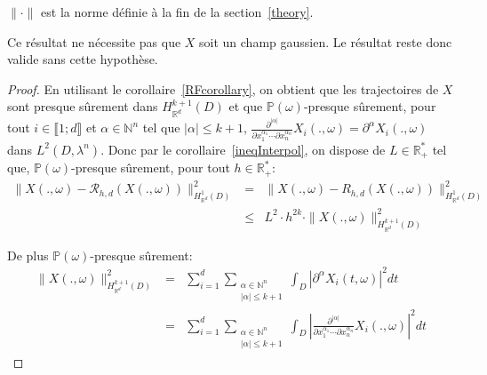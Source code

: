\begin{remark}
$\| \cdot \|$ est la norme définie à la fin de la section~\ref{theory}.
\end{remark}

\begin{remark}
  Ce résultat ne nécessite pas que $X$ soit un champ gaussien. Le résultat
  reste donc valide sans cette hypothèse.
\end{remark}

\begin{proof}
  En utilisant le corollaire~\ref{RFcorollary}, on obtient que les trajectoires
  de $X$ sont presque sûrement dans $H^{k+1}_{\mathbb{R}^d}(D)$ et que $\mathbb{P}(\omega)$-presque sûrement,
  pour tout $i \in \llbracket 1;d \rrbracket$ et $\alpha \in \mathbb{N}^{n}$ tel que $|\alpha| \leq k+1$,
  $\frac{\partial^{|\alpha|}}{\partial x_{1}^{\alpha_1} \cdots \partial x_{n}^{\alpha_n} } X_i(.,\omega) = \partial^{\alpha}X_i(.,\omega)$ dans $L^2(D,\lambda^n)$.
  Donc par le corollaire~\ref{ineqInterpol}, on dispose de $L \in \mathbb{R}_{+}^{*}$ tel que,
  $\mathbb{P}(\omega)$-presque sûrement, pour tout $h \in \mathbb{R}^{*}_{+}$:
  \begin{eqnarray*}
    \|X(.,\omega) - \mathcal{R}_{h,d}(X(.,\omega)) \|_{H^{1}_{\mathbb{R}^d}(D)}^2 &=& \|X(.,\omega) - R_{h,d}(X(.,\omega)) \|_{H^{1}_{\mathbb{R}^d}(D)}^2 \\
    &\leq& L^2 \cdot h^{2k} \cdot \|X(.,\omega)\|_{H^{k+1}_{\mathbb{R}^d}(D)}^2
  \end{eqnarray*}

  \noindent De plus $\mathbb{P}(\omega)$-presque sûrement:
  \begin{eqnarray*}
    \|X(.,\omega)\|_{H^{k+1}_{\mathbb{R}^d}(D)}^2 &=& \displaystyle\sum_{i=1}^{d}  \displaystyle\sum_{\substack{\alpha \in \mathbb{N}^n \\ |\alpha| \leq k+1}} \int_D |\partial^{\alpha}X_i(t,\omega)|^2 dt \\
                                          &=& \displaystyle\sum_{i=1}^{d}  \displaystyle\sum_{\substack{\alpha \in \mathbb{N}^n \\  |\alpha| \leq k+1} } \int_D |\frac{\partial^{|\alpha|}}{\partial x_{1}^{\alpha_1} \cdots \partial x_{n}^{\alpha_n} } X_i(.,\omega)|^2 dt
  \end{eqnarray*}


\end{proof}
